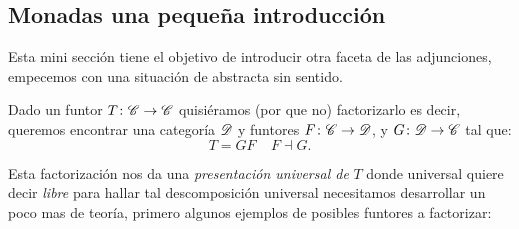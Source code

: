 \documentclass{comunicaciones}
\begin{document}
\subsection[Monadas una pequeña introducción]{Monadas una pequeña introducción}\label{SECMON}


Esta mini sección tiene el objetivo de introducir otra faceta de las adjunciones, empecemos con una situación de abstracta sin sentido.


Dado un funtor $T\colon \EuScript{C}\rightarrow\EuScript{C}$ quisiéramos (por que no) factorizarlo es decir, queremos encontrar una categoría $\D$ y funtores $F\colon \C\rightarrow\D$,
y $G\colon \D\rightarrow \C$ tal que: \[T=GF\;\;\;\; F\dashv G.\]

Esta factorización nos da una \emph{presentación universal de } $T$ donde universal quiere decir \emph{libre}
para hallar tal descomposición universal necesitamos desarrollar un poco mas de teoría, primero algunos ejemplos de posibles funtores a factorizar:
\end{document}
